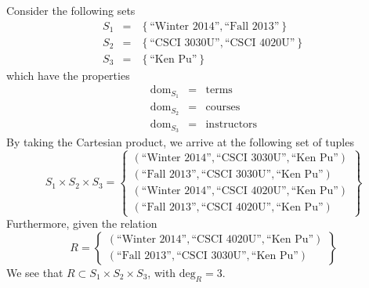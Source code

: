		\begin{ex}
			Consider the following sets
			\begin{eqnarray*}
				S_1 &=& \left\{\textrm{``Winter 2014''}, \textrm{``Fall 2013''}\right\} \\
				S_2 &=& \left\{\textrm{``CSCI 3030U''}, \textrm{``CSCI 4020U''}\right\} \\
				S_3 &=& \left\{\textrm{``Ken Pu''}\right\}
			\end{eqnarray*}
			which have the properties
			\begin{eqnarray*}
				\mathrm{dom}_{S_1} &=& \mathrm{terms} \\
				\mathrm{dom}_{S_2} &=& \mathrm{courses} \\
				\mathrm{dom}_{S_3} &=& \mathrm{instructors}
			\end{eqnarray*}
			By taking the Cartesian product, we arrive at the following set of tuples
			$$
				S_1 \times S_2 \times S_3 =
				\left\{
					\begin{array}{l}
						\left(\textrm{``Winter 2014''}, \textrm{``CSCI 3030U''}, \textrm{``Ken Pu''}\right) \\
						\left(\textrm{``Fall 2013''}, \textrm{``CSCI 3030U''}, \textrm{``Ken Pu''}\right) \\
						\left(\textrm{``Winter 2014''}, \textrm{``CSCI 4020U''}, \textrm{``Ken Pu''}\right) \\
						\left(\textrm{``Fall 2013''}, \textrm{``CSCI 4020U''}, \textrm{``Ken Pu''}\right)
					\end{array}
				\right\}
			$$
			Furthermore, given the relation
			$$
				R =
				\left\{
					\begin{array}{l}
						\left(\textrm{``Winter 2014''}, \textrm{``CSCI 4020U''}, \textrm{``Ken Pu''}\right) \\
						\left(\textrm{``Fall 2013''}, \textrm{``CSCI 3030U''}, \textrm{``Ken Pu''}\right)
					\end{array}
				\right\}
			$$
			We see that $R \subset S_1 \times S_2 \times S_3$, with $\mathrm{deg}_R = 3$.
		\end{ex}
		
		
		
		
		
